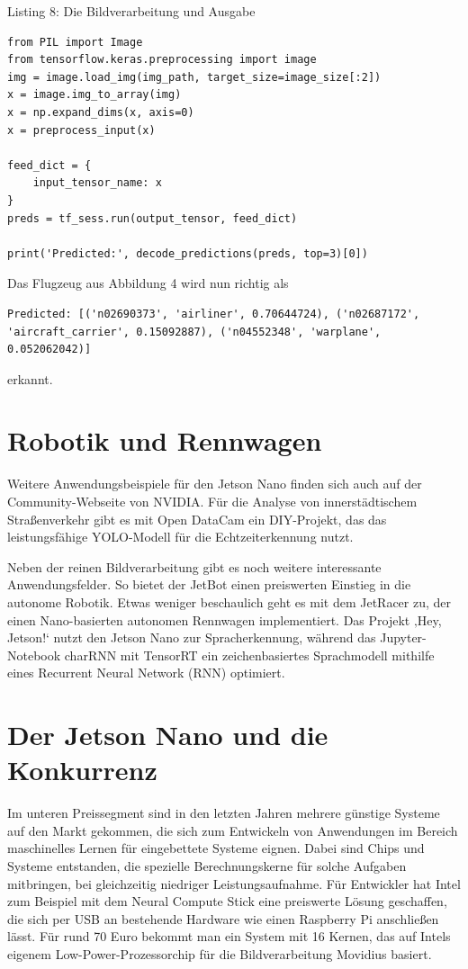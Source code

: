 Listing 8: Die Bildverarbeitung und Ausgabe 
\begin{lstlisting}
from PIL import Image
from tensorflow.keras.preprocessing import image
img = image.load_img(img_path, target_size=image_size[:2])
x = image.img_to_array(img)
x = np.expand_dims(x, axis=0)
x = preprocess_input(x)

feed_dict = {
	input_tensor_name: x
}
preds = tf_sess.run(output_tensor, feed_dict)

print('Predicted:', decode_predictions(preds, top=3)[0])
\end{lstlisting}

Das Flugzeug aus Abbildung 4 wird nun richtig als 

\begin{lstlisting}
Predicted: [('n02690373', 'airliner', 0.70644724), ('n02687172', 'aircraft_carrier', 0.15092887), ('n04552348', 'warplane', 0.052062042)]
\end{lstlisting}


erkannt. 


\section{Robotik und Rennwagen}

Weitere Anwendungsbeispiele für den Jetson Nano finden sich auch auf der Community-Webseite von NVIDIA. Für die Analyse von innerstädtischem Straßenverkehr gibt es mit Open DataCam ein DIY-Projekt, das das leistungsfähige YOLO-Modell für die Echtzeiterkennung nutzt. 

Neben der reinen Bildverarbeitung gibt es noch weitere interessante Anwendungsfelder. So bietet der JetBot einen preiswerten Einstieg in die autonome Robotik. Etwas weniger beschaulich geht es mit dem JetRacer zu, der einen Nano-basierten autonomen Rennwagen implementiert. Das Projekt ‚Hey, Jetson!‘ nutzt den Jetson Nano zur Spracherkennung, während das Jupyter-Notebook charRNN mit TensorRT ein zeichenbasiertes Sprachmodell mithilfe eines Recurrent Neural Network (RNN) optimiert. 


\section{Der Jetson Nano und die Konkurrenz}

Im unteren Preissegment sind in den letzten Jahren mehrere günstige Systeme auf den Markt gekommen, die sich zum Entwickeln von Anwendungen im Bereich maschinelles Lernen für eingebettete Systeme eignen. Dabei sind Chips und Systeme entstanden, die spezielle Berechnungskerne für solche Aufgaben mitbringen, bei gleichzeitig niedriger Leistungsaufnahme. Für Entwickler hat Intel zum Beispiel mit dem Neural Compute Stick eine preiswerte Lösung geschaffen, die sich per USB an bestehende Hardware wie einen Raspberry Pi anschließen lässt. Für rund 70 Euro bekommt man ein System mit 16 Kernen, das auf Intels eigenem Low-Power-Prozessorchip für die Bildverarbeitung Movidius basiert. 

